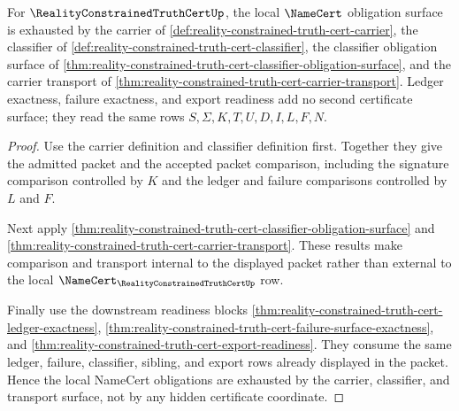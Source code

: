 \begin{theorem}
\label{thm:reality-constrained-truth-cert-namecert-obligation-exhaustion}
For $\RealityConstrainedTruthCertUp$, the local $\NameCert$ obligation surface is
exhausted by the carrier of
\autoref{def:reality-constrained-truth-cert-carrier}, the classifier of
\autoref{def:reality-constrained-truth-cert-classifier}, the classifier
obligation surface of
\autoref{thm:reality-constrained-truth-cert-classifier-obligation-surface}, and
the carrier transport of
\autoref{thm:reality-constrained-truth-cert-carrier-transport}. Ledger
exactness, failure exactness, and export readiness add no second certificate
surface; they read the same rows $S,\Sigma,K,T,U,D,I,L,F,N$.
\end{theorem}
\begin{proof}
Use the carrier definition and classifier definition first. Together they give
the admitted packet and the accepted packet comparison, including the signature
comparison controlled by $K$ and the ledger and failure comparisons controlled
by $L$ and $F$.

Next apply
\autoref{thm:reality-constrained-truth-cert-classifier-obligation-surface} and
\autoref{thm:reality-constrained-truth-cert-carrier-transport}. These results
make comparison and transport internal to the displayed packet rather than
external to the local $\NameCert_{\RealityConstrainedTruthCertUp}$ row.

Finally use the downstream readiness blocks
\autoref{thm:reality-constrained-truth-cert-ledger-exactness},
\autoref{thm:reality-constrained-truth-cert-failure-surface-exactness}, and
\autoref{thm:reality-constrained-truth-cert-export-readiness}. They consume the
same ledger, failure, classifier, sibling, and export rows already displayed in
the packet. Hence the local NameCert obligations are exhausted by the carrier,
classifier, and transport surface, not by any hidden certificate coordinate.
\end{proof}

